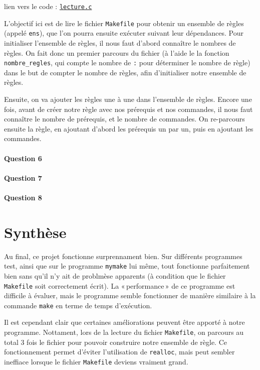 \documentclass{article}
\begin{document}
lien vers le code : \texttt{\href{https://github.com/LostExcalibur/mymake/blob/master/lecture.c}{lecture.c}}

L’objectif ici est de lire le fichier \texttt{Makefile} pour obtenir un ensemble de règles (appelé \texttt{ens}), que l’on pourra ensuite exécuter suivant leur dépendances. Pour initialiser l’ensemble de règles, il nous faut d’abord connaître le nombres de règles. On fait donc un premier parcours du fichier (à l’aide le la fonction \texttt{nombre\_regles}, qui compte le nombre de \texttt{:} pour déterminer le nombre de règle) dans le but de compter le nombre de règles, afin d’initialiser notre ensemble de règles.

Ensuite, on va ajouter les règles une à une dans l’ensemble de règles. Encore une fois, avant de créer notre règle avec nos prérequis et nos commandes, il nous faut connaître le nombre de prérequis, et le nombre de commandes. On re-parcours ensuite la règle, en ajoutant d’abord les prérequis un par un, puis en ajoutant les commandes.

\paragraph{Question 6}

\paragraph{Question 7}

\paragraph{Question 8}

\section{Synthèse}

Au final, ce projet fonctionne surprennament bien. Sur différents programmes test, ainsi que sur le programme \texttt{mymake} lui même, tout fonctionne parfaitement bien sans qu’il n’y ait de problmèse apparents (à condition que le fichier \texttt{Makefile} soit correctement écrit). La « performance » de ce programme est difficile à évaluer, mais le programme semble fonctionner de manière similaire à la commande \texttt{make} en terme de temps d’exécution.

Il est cependant clair que certaines améliorations peuvent être apporté à notre programme. Nottament, lors de la lecture du fichier \texttt{Makefile}, on parcours au total 3 fois le fichier pour pouvoir construire notre ensemble de règle. Ce fonctionnement permet d’éviter l’utilisation de \texttt{realloc}, mais peut sembler ineffiace lorsque le fichier \texttt{Makefile} deviens vraiment grand.
\end{document}
